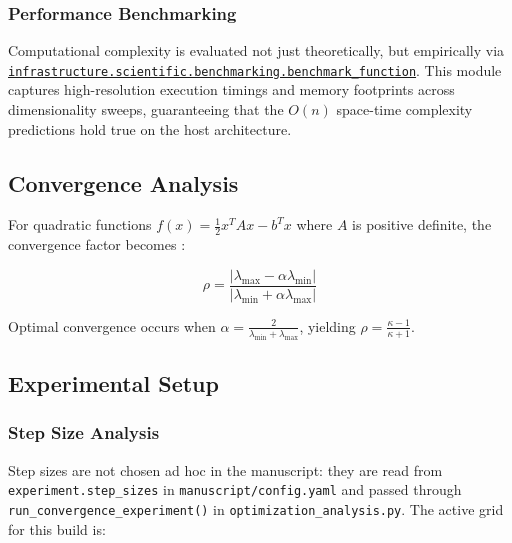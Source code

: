 \documentclass[
]{article}
\begin{document}
\subsubsection{Performance Benchmarking}\label{performance-benchmarking}

Computational complexity is evaluated not just theoretically, but
empirically via
\href{https://github.com/docxology/template/blob/main/infrastructure/scientific/benchmarking.py}{\texttt{infrastructure.scientific.benchmarking.benchmark\_function}}.
This module captures high-resolution execution timings and memory
footprints across dimensionality sweeps, guaranteeing that the \(O(n)\)
space-time complexity predictions hold true on the host architecture.

\subsection{Convergence Analysis}\label{convergence-analysis}

For quadratic functions \(f(x) = \frac{1}{2}x^T A x - b^T x\) where
\(A\) is positive definite, the convergence factor becomes
\cite{bertsekas1999nonlinear}:

\begin{equation}
\label{eq:convergence_factor}
\rho = \frac{|\lambda_{\max} - \alpha\lambda_{\min}|}{|\lambda_{\min} + \alpha\lambda_{\max}|}
\end{equation}

Optimal convergence occurs when
\(\alpha = \frac{2}{\lambda_{\min} + \lambda_{\max}}\), yielding
\(\rho = \frac{\kappa - 1}{\kappa + 1}\).

\subsection{Experimental Setup}\label{experimental-setup}

\subsubsection{Step Size Analysis}\label{step-size-analysis}

Step sizes are not chosen ad hoc in the manuscript: they are read from
\texttt{experiment.step\_sizes} in \texttt{manuscript/config.yaml} and
passed through \texttt{run\_convergence\_experiment()} in
\texttt{optimization\_analysis.py}. The active grid for this build is:
\end{document}

